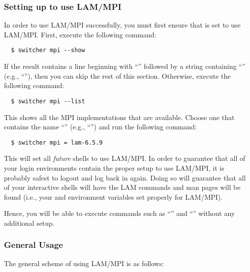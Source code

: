 \subsubsection{Setting up  to use LAM/MPI}

In order to use LAM/MPI successfully, you must first ensure that
 is set to use LAM/MPI.  First, execute the following
command:

\begin{verbatim}
  $ switcher mpi --show
\end{verbatim}
  
If the result contains a line beginning with ``''
followed by a string containing ``'' (e.g.,
``''), then you can skip the rest of this section.
Otherwise, execute the following command:

\begin{verbatim}
  $ switcher mpi --list
\end{verbatim}

This shows all the MPI implementations that are available.  Choose one
that contains the name ``'' (e.g., ``'') and
run the following command:

\begin{verbatim}
  $ switcher mpi = lam-6.5.9
\end{verbatim}

This will set all {\em future} shells to use LAM/MPI.  In order to
guarantee that all of your login environments contain the proper setup
to use LAM/MPI, it is probably safest to logout and log back in again.
Doing so will guarantee that all of your interactive shells will have
the LAM commands and man pages will be found (i.e., your 
and  environment variables set properly for LAM/MPI).

Hence, you will be able to execute commands such as ``''
and ``'' without any additional setup.

\subsubsection{General Usage}

The general scheme of using LAM/MPI is as follows:

